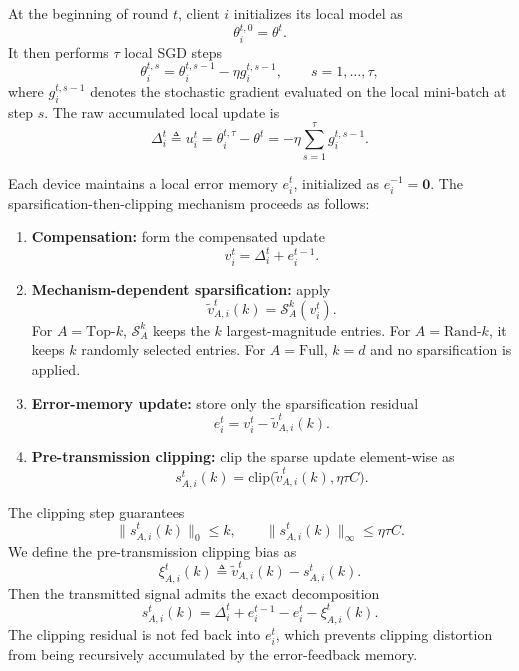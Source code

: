 \documentclass[conference]{IEEEtran}
\begin{document}
At the beginning of round $t$, client $i$ initializes its local model as
\begin{equation}
    \theta_i^{t,0}=\theta^t.
\end{equation}
It then performs $\tau$ local SGD steps
\begin{equation}
    \theta_i^{t,s}=\theta_i^{t,s-1}-\eta g_i^{t,s-1},
    \qquad s=1,\ldots,\tau,
\end{equation}
where $g_i^{t,s-1}$ denotes the stochastic gradient evaluated on the local mini-batch at step $s$. The raw accumulated local update is
\begin{equation}
    \Delta_i^t\triangleq u_i^t
    =\theta_i^{t,\tau}-\theta^t
    =-\eta\sum_{s=1}^{\tau}g_i^{t,s-1}.
\end{equation}

Each device maintains a local error memory $e_i^t$, initialized as $e_i^{-1}=\mathbf{0}$. The sparsification-then-clipping mechanism proceeds as follows:
\begin{enumerate}
    \item \textbf{Compensation:} form the compensated update
    \begin{equation}
        v_i^t=\Delta_i^t+e_i^{t-1}.
    \end{equation}
    \item \textbf{Mechanism-dependent sparsification:} apply
    \begin{equation}
        \tilde v_{A,i}^t(k)=\mathcal{S}_A^k(v_i^t).
    \end{equation}
    For $A=\mathrm{Top}\text{-}k$, $\mathcal{S}_A^k$ keeps the $k$ largest-magnitude entries. For $A=\mathrm{Rand}\text{-}k$, it keeps $k$ randomly selected entries. For $A=\mathrm{Full}$, $k=d$ and no sparsification is applied.
    \item \textbf{Error-memory update:} store only the sparsification residual
    \begin{equation}
        e_i^t=v_i^t-\tilde v_{A,i}^t(k).
    \end{equation}
    \item \textbf{Pre-transmission clipping:} clip the sparse update element-wise as
    \begin{equation}
        s_{A,i}^t(k)=\mathrm{clip}\big(\tilde v_{A,i}^t(k),\eta\tau C\big).
    \end{equation}
\end{enumerate}
The clipping step guarantees
\begin{equation}
    \|s_{A,i}^t(k)\|_0\le k,
    \qquad
    \|s_{A,i}^t(k)\|_{\infty}\le \eta\tau C.
\end{equation}
We define the pre-transmission clipping bias as
\begin{equation}
    \xi_{A,i}^t(k)\triangleq \tilde v_{A,i}^t(k)-s_{A,i}^t(k).
\end{equation}
Then the transmitted signal admits the exact decomposition
\begin{equation}
    \label{eqn:transmit_signal}
    s_{A,i}^t(k)
    =\Delta_i^t+e_i^{t-1}-e_i^t-\xi_{A,i}^t(k).
\end{equation}
The clipping residual is not fed back into $e_i^t$, which prevents clipping distortion from being recursively accumulated by the error-feedback memory.
\end{document}

